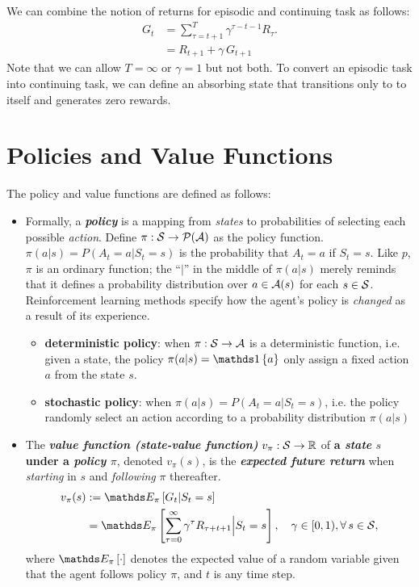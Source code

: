 \documentclass[11pt]{article}
\begin{document}
We can combine the notion of returns for episodic and continuing task as follows:
\begin{align}
G_{t}&= \sum_{\tau = t+1}^{T}\gamma^{\tau-t-1}R_{\tau}.  \label{eqn: return} \\
&=R_{t+1} + \gamma\,G_{t+1}  \nonumber
\end{align} Note that we can allow $T=\infty$ or $\gamma=1$ but not both. To convert an episodic task into continuing task, we can define an absorbing state that transitions only to to itself and generates zero rewards. 


\section{Policies and Value Functions}
The policy and value functions are defined as follows:
\begin{itemize}
\item Formally, a \emph{\textbf{policy}} is a mapping from \emph{states} to probabilities of selecting each possible \emph{action}. Define $\pi: {\mathcal S} \rightarrow {\mathcal P}({\mathcal A})$ as the policy function. $\pi(a|s) = P(A_t=a | S_t=s)$  is the probability that $A_t = a$ if $S_t = s$.  Like $p$, $\pi$ is an ordinary function; the “$|$” in the middle of $\pi(a|s)$ merely reminds that it defines a probability distribution over $a \in {\mathcal A}(s)$ for each $s \in {\mathcal S}$. Reinforcement learning methods specify how the agent’s policy is \emph{changed} as a result of its experience. 
\begin{itemize}
\item \textbf{deterministic policy}: when $\pi: {\mathcal S} \rightarrow {\mathcal A}$ is a deterministic function, i.e. given a state, the policy $\pi(a|s) = \ind{a}$ only assign a fixed action $a$ from the state $s$.

\item \textbf{stochastic policy}: when $\pi(a|s) = P(A_t=a | S_t=s)$, i.e. the policy randomly select an action according to a probability distribution $\pi(a|s)$
\end{itemize}

\item The \emph{\textbf{value function (state-value function) }}$v_{\pi}: {\mathcal S} \rightarrow {\mathbb R}$ of \textbf{a \emph{state} $s$ under a \emph{policy} $\pi$}, denoted $v_{\pi}(s)$, is the \emph{\textbf{expected future return}} when \emph{starting} in $s$ and \emph{following} $\pi$ thereafter. 
\begin{align}
v_{\pi}(s) &:= \E{\pi}{G_{t} | S_{t} = s}  \label{eqn: value_fun}\\
&= \E{\pi}{\sum_{\tau=0}^{\infty}\gamma^{\tau}R_{\tau+t+1} \Big| S_{t} = s}, \quad \gamma \in [0,1), \forall\, s\in \cS, \nonumber
\end{align} where $\E{\pi}{\cdot}$ denotes the expected value of a random variable given that the agent follows policy $\pi$, and $t$ is any time step.


\end{itemize}
\end{document}
